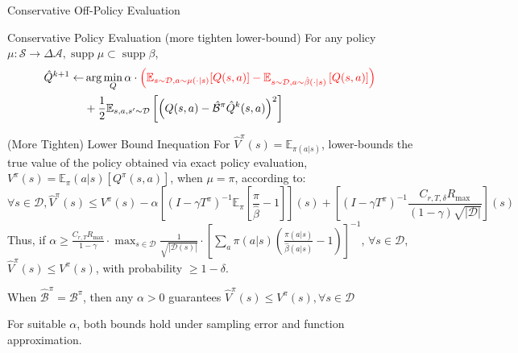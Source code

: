 \documentclass[11pt]{beamer}
\newcommand{\mbb}[1]{\mathbb{#1}}
\newcommand{\mc}[1]{\mathcal{#1}}
\newcommand{\abs}[1]{\left\lvert #1 \right\rvert}
\newcommand{\supp}{\operatorname{supp}}
\begin{document}
\begin{frame}{Conservative Off-Policy Evaluation}
    \begin{block}{Conservative Policy Evaluation (more tighten lower-bound)}
    For any policy $\mu : \mc{S} \to \Delta{\mc{A}}, \supp \mu \subset \supp \beta$,
    \[
    \begin{aligned}
          \hat{Q}^{k+1} \leftarrow &\arg \min_{Q} \alpha \cdot \textcolor{red}{\left(\mbb{E}_{s \sim \mc{D}, a \sim \mu(\cdot|s)}[Q(s,a)] - \mbb{E}_{s \sim \mc{D}, a \sim \hat{\beta}(\cdot|s)} \left[Q(s,a)\right] \right)} \\
          &+ \frac{1}{2} \mbb{E}_{s,a,s^\prime \sim \mc{D}} \left[ \left(Q(s,a) - \hat{\mc{B}}^\pi \hat{Q}^{k}(s,a)\right)^2\right]
  \end{aligned}
  \]
  \end{block}

  \begin{block}{(More Tighten) Lower Bound Inequation}
    For $\hat{V}^{\pi}(s) = \mbb{E}_{\pi(a|s)}$, lower-bounds the true value of the policy obtained via exact policy evaluation, $V^\pi(s) = \mbb{E}_{\pi}(a|s) [Q^\pi(s,a)]$, when $\mu=\pi$, according to:
    \[
      \forall s \in \mc{D}, \hat{V}^\pi (s) \leq V^\pi (s) - \alpha \left[(I - \gamma T^\pi)^{-1} \mbb{E}_\pi  \left[\frac{\pi}{\hat{\beta}} - 1\right]\right] (s) + \left[(I - \gamma T^\pi)^{-1} \frac{C_{r, T, \delta}R_{\text{max}}}{(1-\gamma)\sqrt{\abs{\mc{D}}}}\right](s)
    \]
    Thus, if $\alpha \geq \frac{C_{r,T}R_{\text{max}}}{1-\gamma} \cdot \max_{s\in \mc{D}}\frac{1}{\sqrt{\abs{\mc{D}(s)}}}\cdot \left[\sum_a \pi(a|s) (\frac{\pi(a|s)}{\hat{\beta}(a|s)}-1)\right]^{-1}$, $\forall s \in \mc{D}$, $\hat{V}^{\pi}(s) \leq V^\pi (s)$, with probability $\geq 1 - \delta$.

    When $\hat{\mc{B}}^\pi = \mc{B}^\pi$, then any $\alpha >0$ guarantees $\hat{V}^\pi (s) \leq V^{\pi} (s), \forall s \in \mc{D}$
  \end{block}
  For suitable $\alpha$, both bounds hold under sampling error and function approximation.
\end{frame}
\end{document}
